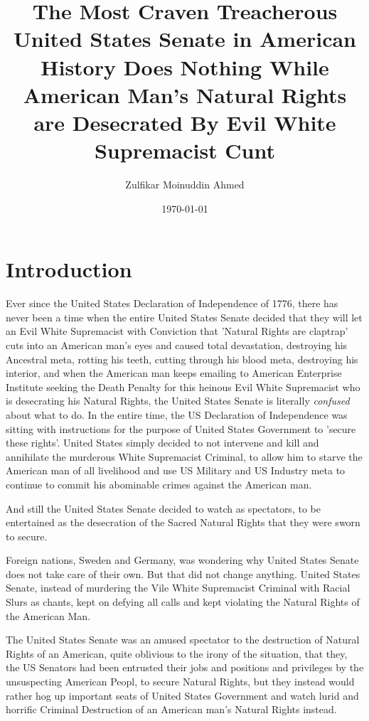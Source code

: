 \documentclass{amsart}
\title{The Most Craven Treacherous United States Senate in American History Does Nothing While American Man's Natural Rights are Desecrated By Evil White Supremacist Cunt}
\author{Zulfikar Moinuddin Ahmed}
\date{\today}
\begin{document}
\maketitle

\section{Introduction}

Ever since the United States Declaration of Independence of 1776, there has never been a time when the entire United States Senate decided that they will let an Evil White Supremacist with Conviction that 'Natural Rights are claptrap' cuts into an American man's eyes and caused total devastation, destroying his Ancestral meta, rotting his teeth, cutting through his blood meta, destroying his interior, and when the American man keeps emailing to American Enterprise Institute seeking the Death Penalty for this heinous Evil White Supremacist who is desecrating his Natural Rights, the United States Senate is literally {\em confused} about what to do.  In the entire time, the US Declaration of Independence was sitting with instructions for the purpose of United States Government to 'secure these rights'.  United States simply decided to not intervene and kill and annihilate the murderous White Supremacist Criminal, to allow him to starve the American man of all livelihood and use US Military and US Industry meta to continue to commit his abominable crimes against the American man.

And still the United States Senate decided to watch as spectators, to be entertained as the desecration of the Sacred Natural Rights that they were sworn to secure.  

Foreign nations, Sweden and Germany, was wondering why United States Senate does not take care of their own.  But that did not change anything.  United States Senate, instead of murdering the Vile White Supremacist Criminal with Racial Slurs as chants, kept on defying all calls and kept violating the Natural Rights of the American Man.

The United States Senate was an amused spectator to the destruction of Natural Rights of an American, quite oblivious to the irony of the situation, that they, the US Senators had been entrusted their jobs and positions and privileges by the unsuspecting American Peopl, to secure Natural Rights, but they instead would rather hog up important seats of United States Government and watch lurid and horrific Criminal Destruction of an American man's Natural Rights instead.
\end{document}
